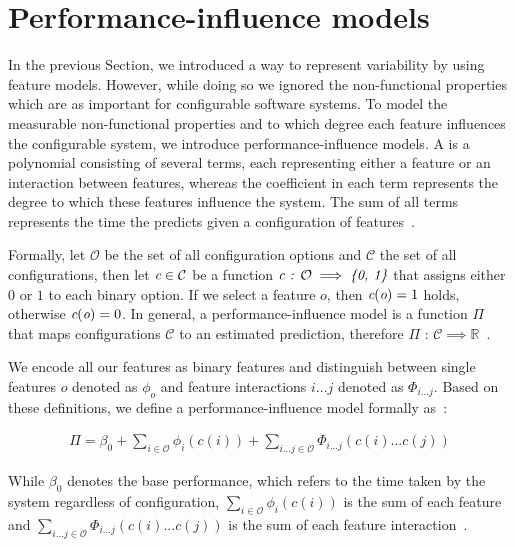 \section{Performance-influence models}\label{ch:performance-influence-models}
In the previous Section, we introduced a way to represent variability by using feature models.
However, while doing so we ignored the non-functional properties which are as important for configurable software systems.
To model the measurable non-functional properties and to which degree each feature influences the configurable system,
we introduce performance-influence models. 
A {\perfInfluenceModel} is a polynomial consisting of several terms, each representing either a feature or an interaction between features, 
whereas the coefficient in each term represents the degree to which these features influence the system.  
The sum of all terms represents the time the {\perfInfluenceModel} predicts given a configuration of features~\cite{Performance-influence-models-for-highly-configurable-systems}.

Formally, let $\mathcal{O}$ be the set of all configuration options and $\mathcal{C}$ the set of all configurations, 
then let $\emph{c} \in \mathcal{C}$ be a function $\emph{c} \textit{ : } \mathcal{O} \implies \emph{\{0, 1\}}$ that assigns either $0$ or $1$ to each binary option. 
If we select a feature $o$, then $\emph{c}(\emph{o}) = 1$ holds, otherwise $\emph{c}(\emph{o}) = 0$. 
In general, a performance-influence model is a function $\Pi$ that maps configurations $\mathcal{C}$ to an estimated prediction, 
therefore $\Pi \textit{ : } \mathcal{C} \implies \mathbb{R}$~\cite{Performance-influence-models-for-highly-configurable-systems}. 

We encode all our features as binary features and distinguish between single features $o$ denoted as $\phi_o$ and feature interactions $i ... j$ denoted as $\Phi_{i...j}$. 
Based on these definitions, we define a performance-influence model formally as~\cite{Performance-influence-models-for-highly-configurable-systems}:

\begin{gather}
    \Pi = \beta_0 + \sum_{i \in \mathcal{O}} \phi_i(c(i)) + \sum_{i...j \in \mathcal{O}} \Phi_{i...j}(c(i)...c(j))
\end{gather}

While $\beta_0$ denotes the base performance, which refers to the time taken by the system regardless of configuration, $\sum_{i \in \mathcal{O}} \phi_i(c(i))$ 
is the sum of each feature and $\sum_{i...j \in \mathcal{O}} \Phi_{i...j}(c(i)...c(j))$ is the sum of each feature interaction~\cite{Performance-influence-models-for-highly-configurable-systems}.

